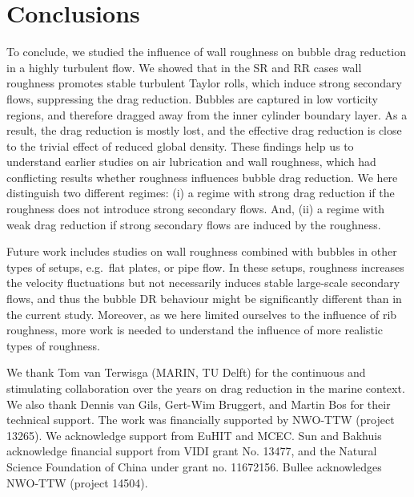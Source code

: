 \documentclass{jfm}
\begin{document}
\section{Conclusions}
 
To conclude, we studied the influence of wall roughness on bubble drag reduction in a highly turbulent flow. We showed that in the SR and RR cases wall roughness promotes stable turbulent Taylor rolls, which induce strong secondary flows, suppressing the drag reduction. Bubbles are captured in low vorticity regions, and therefore dragged away from the inner cylinder boundary layer. As a result, the drag reduction is mostly lost, and the effective drag reduction is close to the trivial effect of reduced global density. 
These findings help us to understand earlier studies on air lubrication and wall roughness, which had conflicting results whether roughness influences bubble drag reduction. We here distinguish two different regimes: (i) a regime with strong drag reduction if the roughness does not introduce strong secondary flows. And, (ii) a regime with weak drag reduction if strong secondary flows are induced by the roughness.

Future work  includes  studies on  wall roughness combined with bubbles  in other types of setups, e.g.\ flat plates, or pipe flow. In these setups, roughness increases the velocity fluctuations but not necessarily induces stable large-scale  secondary flows, and thus the bubble DR behaviour might be significantly different than in the current study. Moreover, as we here limited ourselves to the influence of rib roughness, more work is needed to understand the influence of more realistic types of roughness.

\begin{acknowledgments}
We thank Tom van Terwisga (MARIN, TU Delft) for the continuous and stimulating collaboration over the years on drag reduction in the marine context. We also thank Dennis van Gils, Gert-Wim Bruggert, and Martin Bos for their technical support. The work was financially supported by NWO-TTW (project 13265). We acknowledge support from EuHIT and MCEC. Sun and Bakhuis acknowledge financial support from VIDI grant No. 13477, and the Natural Science Foundation of China under grant no. 11672156. Bullee acknowledges NWO-TTW (project 14504).

\end{acknowledgments}
\end{document}
